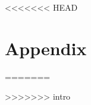 \documentclass[
	  paper    = a4,
	  BCOR     = 10mm,
	  twoside,
	  fontsize = 12pt,
	  fleqn,
	  toc      = bibnumbered,
	  toc      = listofnumbered,
	  numbers  = noendperiod,
	  headings = normal,
	  listof   = leveldown,
	  version  = 3.03
	]{scrreprt}
\begin{document}


	

<<<<<<< HEAD
	\part{Appendix}
	\begin{appendix}
	{}
	
	\end{appendix}
=======
	{}
	\citestyle{egu}
	
>>>>>>> intro
\end{document}
